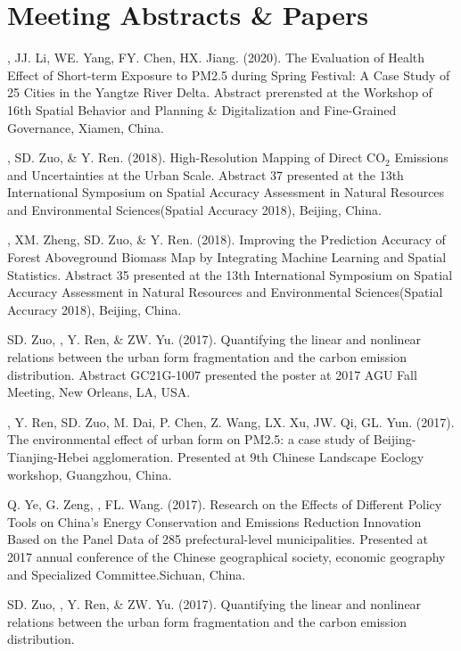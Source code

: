 \section*{Meeting Abstracts \& Papers}
\begin{etaremune}
\item
    \Shaoqing, JJ. Li, WE. Yang, FY. Chen, HX. Jiang. (2020).
    The Evaluation of Health Effect of Short-term Exposure to PM2.5 during Spring Festival: A Case Study of 25 Cities in the Yangtze River Delta.
    Abstract prerensted at the Workshop of 16th Spatial Behavior and Planning \& Digitalization and Fine-Grained Governance, Xiamen, China.
\item
    \Shaoqing, SD. Zuo, \& Y. Ren. (2018).
    High-Resolution Mapping of Direct CO$_2$ Emissions and Uncertainties at the Urban Scale.
    Abstract 37 presented at the 13th International Symposium on Spatial Accuracy Assessment in Natural Resources and Environmental Sciences(Spatial Accuracy 2018), Beijing, China.
\item
    \Shaoqing\CF, XM. Zheng, SD. Zuo, \& Y. Ren. (2018).
    Improving the Prediction Accuracy of Forest Aboveground Biomass Map by Integrating Machine Learning and Spatial Statistics.
    Abstract 35 presented at the 13th International Symposium on Spatial Accuracy Assessment in Natural Resources and Environmental Sciences(Spatial Accuracy 2018), Beijing, China.
\item
    SD. Zuo, \Shaoqing, Y. Ren, \&  ZW. Yu. (2017).
    Quantifying the linear and nonlinear relations between the urban form fragmentation and the carbon emission distribution.
    Abstract GC21G-1007 presented the poster at 2017 AGU Fall Meeting, New Orleans, LA, USA.
\item
    \Shaoqing, Y. Ren, SD. Zuo, M. Dai, P. Chen, Z. Wang, LX. Xu, JW. Qi, GL. Yun. (2017).
    The environmental effect of urban form on PM2.5: a case study of Beijing-Tianjing-Hebei agglomeration.
    Presented at 9th Chinese Landscape Eoclogy workshop, Guangzhou, China.
\item
    Q. Ye, G. Zeng, \Shaoqing, FL. Wang. (2017).
     Research on the Effects of Different Policy Tools on China's Energy Conservation and Emissions Reduction Innovation Based on the Panel Data of 285 prefectural-level municipalities.
     Presented at 2017 annual conference of the Chinese geographical society, economic geography and Specialized Committee.Sichuan, China.
\item
    SD. Zuo, \Shaoqing, Y. Ren, \&  ZW. Yu. (2017).
    Quantifying the linear and nonlinear relations between the urban form fragmentation and the carbon emission distribution.

\end{etaremune}
